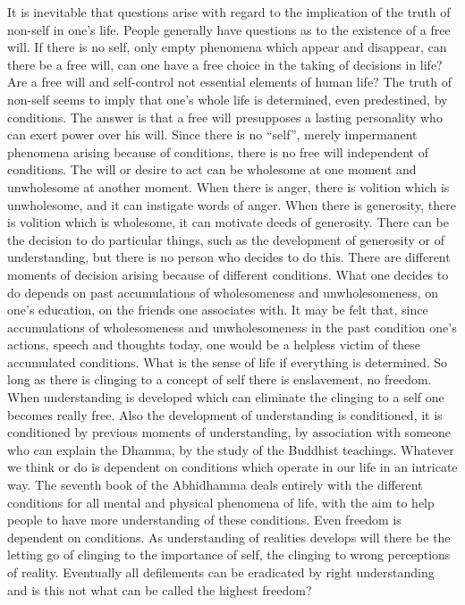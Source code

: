 \documentclass{book}
\begin{document}
It is inevitable that questions arise with regard to the implication of
the truth of non-self in one's life. People generally have questions as
to the existence of a free will. If there is no self, only empty
phenomena which appear and disappear, can there be a free will, can one
have a free choice in the taking of decisions in life? Are a free will
and self-control not essential elements of human life? The truth of
non-self seems to imply that one's whole life is determined, even
predestined, by conditions. The answer is that a free will presupposes a
lasting personality who can exert power over his will. Since there is no
``self'', merely impermanent phenomena arising because of conditions,
there is no free will independent of conditions. The will or desire to
act can be wholesome at one moment and unwholesome at another moment.
When there is anger, there is volition which is unwholesome, and it can
instigate words of anger. When there is generosity, there is volition
which is wholesome, it can motivate deeds of generosity. There can be
the decision to do particular things, such as the development of
generosity or of understanding, but there is no person who decides to do
this. There are different moments of decision arising because of
different conditions. What one decides to do depends on past
accumulations of wholesomeness and unwholesomeness, on one's education,
on the friends one associates with. It may be felt that, since
accumulations of wholesomeness and unwholesomeness in the past condition
one's actions, speech and thoughts today, one would be a helpless victim
of these accumulated conditions. What is the sense of life if everything
is determined. So long as there is clinging to a concept of self there
is enslavement, no freedom. When understanding is developed which can
eliminate the clinging to a self one becomes really free. Also the
development of under­standing is conditioned, it is conditioned by
previous moments of understanding, by association with someone who can
explain the Dhamma, by the study of the Buddhist teachings. Whatever we
think or do is dependent on conditions which operate in our life in an
intricate way. The seventh book of the Abhidhamma deals entirely with
the different conditions for all mental and physical phe­nomena of life,
with the aim to help people to have more understanding of these
condi­tions. Even freedom is dependent on conditions. As understanding 
of reali­ties develops will there be the letting go of clinging to the 
importance of self, the clinging to wrong perceptions of reality. 
Eventually all defilements can be eradicated by right understanding and 
is this not what can be called the highest freedom?
\end{document}
